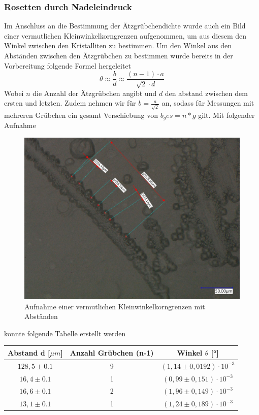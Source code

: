         \subsubsection*{Rosetten durch Nadeleindruck}
            Im Anschluss an die Bestimmung der Ätzgrübchendichte wurde auch ein Bild einer vermutlichen Kleinwinkelkorngrenzen aufgenommen, um aus diesem
            den Winkel zwischen den Kristalliten zu bestimmen. Um den Winkel aus den Abständen zwischen den Ätzgrübchen zu bestimmen wurde bereits in der Vorbereitung
            folgende Formel hergeleitet
            \begin{equation}
                \theta \approx \frac{b}{d} \approx \frac{(n-1)\cdot a}{\sqrt{2}\cdot d}
            \end{equation}
            Wobei $n$ die Anzahl der Ätzgrübchen angibt und $d$ den abstand zwischen dem ersten und letzten. Zudem nehmen wir für $b=\frac{a}{\sqrt{2}}$ an, sodass für
            Messungen mit mehreren Grübchen ein gesamt Verschiebung von $b_ges = n * g$ gilt.
            Mit folgender Aufnahme
            \begin{figure}[H]
                \centering
                \includegraphics[width=\textwidth]{Images/kleinwinkelkorngrenze 2.jpg}
                \caption{Aufnahme einer vermutlichen Kleinwinkelkorngrenzen mit Abständen}
            \end{figure}
            konnte folgende Tabelle erstellt werden
            \begin{table}[H]
                \centering
                \begin{tabular}[]{c|c|c}
                    Abstand d [$\mu m$] & Anzahl Grübchen (n-1) & Winkel $\theta$ [°] \\
                    \hline
                    $128,5 \pm 0.1$ & 9 & $(1,14 \pm 0,0192)\cdot 10^{-3}$\\
                    $16,4 \pm 0.1$ & 1 & $(0,99 \pm 0,151)\cdot 10^{-3}$\\
                    $16,6 \pm 0.1$ & 2 & $(1,96 \pm 0,149)\cdot 10^{-3}$\\
                    $13,1 \pm 0.1$ & 1 & $(1,24 \pm 0,189)\cdot 10^{-3}$\\   
                \end{tabular}
            \end{table}
